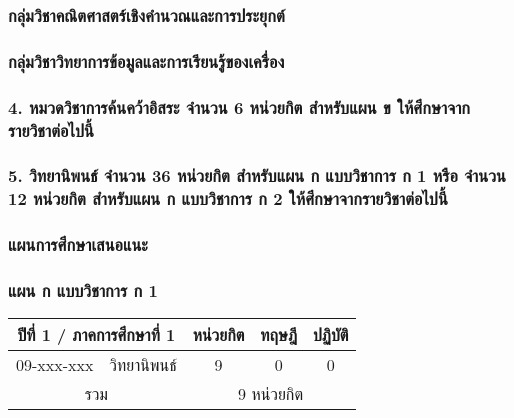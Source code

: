 \subsubsection*{กลุ่มวิชาคณิตศาสตร์เชิงคำนวณและการประยุกต์}



\subsubsection*{กลุ่มวิชาวิทยาการข้อมูลและการเรียนรู้ของเครื่อง}



\subsubsection*{4. หมวดวิชาการค้นคว้าอิสระ จำนวน 6 หน่วยกิต สำหรับแผน ข ให้ศึกษาจากรายวิชาต่อไปนี้}



\subsubsection*{5. วิทยานิพนธ์ จำนวน 36 หน่วยกิต สำหรับแผน ก แบบวิชาการ ก 1 หรือ จำนวน 12 หน่วยกิต สำหรับแผน ก แบบวิชาการ ก 2 ให้ศึกษาจากรายวิชาต่อไปนี้}



\clearpage
\subsubsection{แผนการศึกษาเสนอแนะ}

\subsubsection*{แผน ก แบบวิชาการ ก 1}


\renewcommand{\arraystretch}{1.4}
\begin{tabular}{|cp{}|ccc|}
\hline
\multicolumn{2}{|c|}{ปีที่ 1 / ภาคการศึกษาที่ 1} & \multicolumn{1}{c|}{หน่วยกิต} & \multicolumn{1}{c|}{ทฤษฎี} & \multicolumn{1}{c|}{ปฏิบัติ}  \\ \hline
\multicolumn{1}{|c|}{09-xxx-xxx}  & วิทยานิพนธ์  & \multicolumn{1}{c|}{9}        & \multicolumn{1}{c|}{0}     & \multicolumn{1}{c|}{0}                    \\ \hline
\multicolumn{2}{|c|}{รวม}                        & \multicolumn{3}{c|}{9 หน่วยกิต}                                                                            \\ \hline
\end{tabular}

